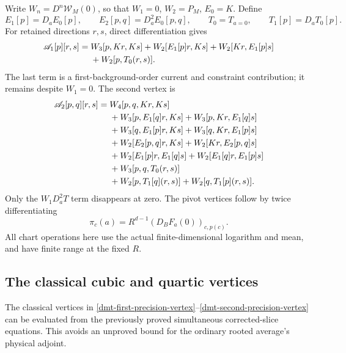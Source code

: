 Write \(W_n=D^n\mathcal W_M(0)\), so that
\(W_1=0\), \(W_2=P_M\), \(E_0=K\). Define
\[
 E_1[p]=D_aE_0[p],\qquad E_2[p,q]=D_a^2E_0[p,q],
 \qquad T_0=T_{a=0},\qquad T_1[p]=D_aT_0[p].
\]
For retained directions \(r,s\), direct differentiation gives
\begin{align}
 \mathscr A_1[p][r,s]
 ={}&W_3[p,Kr,Ks]
       +W_2[E_1[p]r,Ks]+W_2[Kr,E_1[p]s]\notag\\
 &+W_2[p,T_0(r,s)].
 \label{dmt-first-precision-vertex}
\end{align}
The last term is a first-background-order current and
constraint contribution; it remains despite \(W_1=0\).
The second vertex is
\begin{align}
 \mathscr A_2[p,q][r,s]
 ={}&W_4[p,q,Kr,Ks]\notag\\
 &+W_3[p,E_1[q]r,Ks]+W_3[p,Kr,E_1[q]s]\notag\\
 &+W_3[q,E_1[p]r,Ks]+W_3[q,Kr,E_1[p]s]\notag\\
 &+W_2[E_2[p,q]r,Ks]+W_2[Kr,E_2[p,q]s]\notag\\
 &+W_2[E_1[p]r,E_1[q]s]
       +W_2[E_1[q]r,E_1[p]s]\notag\\
 &+W_3[p,q,T_0(r,s)]\notag\\
 &+W_2[p,T_1[q](r,s)]
       +W_2[q,T_1[p](r,s)].
 \label{dmt-second-precision-vertex}
\end{align}
Only the \(W_1D_a^2T\) term disappears at zero.
The pivot vertices follow by twice differentiating
\begin{equation}
             \pi_c(a)=R^{d-1}(D_BF_a(0))_{c,p(c)}.
 \label{dmt-pivot-vertex-definition}
\end{equation}
All chart operations here use the actual finite-dimensional
logarithm and mean, and have finite range at the fixed \(R\).

\subsection{The classical cubic and quartic vertices}
\label{dmt-classical-vertices-section}

The classical vertices in
\eqref{dmt-first-precision-vertex}--\eqref{dmt-second-precision-vertex}
can be evaluated from the previously proved simultaneous
corrected-slice equations. This avoids an unproved bound for
the ordinary rooted average's physical adjoint.

